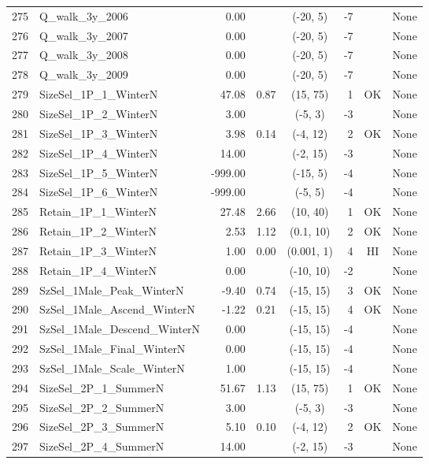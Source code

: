 \documentclass[12pt,]{article}
\begin{document}
\begin{landscape}
\begin{longtable}{rlrrcrcl}
  275 & Q\_walk\_3y\_2006 & 0.00 &  & (-20, 5) & -7 &  & None \\ 
  276 & Q\_walk\_3y\_2007 & 0.00 &  & (-20, 5) & -7 &  & None \\ 
  277 & Q\_walk\_3y\_2008 & 0.00 &  & (-20, 5) & -7 &  & None \\ 
  278 & Q\_walk\_3y\_2009 & 0.00 &  & (-20, 5) & -7 &  & None \\ 
  279 & SizeSel\_1P\_1\_WinterN & 47.08 & 0.87 & (15, 75) & 1 & OK & None \\ 
  280 & SizeSel\_1P\_2\_WinterN & 3.00 &  & (-5, 3) & -3 &  & None \\ 
  281 & SizeSel\_1P\_3\_WinterN & 3.98 & 0.14 & (-4, 12) & 2 & OK & None \\ 
  282 & SizeSel\_1P\_4\_WinterN & 14.00 &  & (-2, 15) & -3 &  & None \\ 
  283 & SizeSel\_1P\_5\_WinterN & -999.00 &  & (-15, 5) & -4 &  & None \\ 
  284 & SizeSel\_1P\_6\_WinterN & -999.00 &  & (-5, 5) & -4 &  & None \\ 
  285 & Retain\_1P\_1\_WinterN & 27.48 & 2.66 & (10, 40) & 1 & OK & None \\ 
  286 & Retain\_1P\_2\_WinterN & 2.53 & 1.12 & (0.1, 10) & 2 & OK & None \\ 
  287 & Retain\_1P\_3\_WinterN & 1.00 & 0.00 & (0.001, 1) & 4 & HI & None \\ 
  288 & Retain\_1P\_4\_WinterN & 0.00 &  & (-10, 10) & -2 &  & None \\ 
  289 & SzSel\_1Male\_Peak\_WinterN & -9.40 & 0.74 & (-15, 15) & 3 & OK & None \\ 
  290 & SzSel\_1Male\_Ascend\_WinterN & -1.22 & 0.21 & (-15, 15) & 4 & OK & None \\ 
  291 & SzSel\_1Male\_Descend\_WinterN & 0.00 &  & (-15, 15) & -4 &  & None \\ 
  292 & SzSel\_1Male\_Final\_WinterN & 0.00 &  & (-15, 15) & -4 &  & None \\ 
  293 & SzSel\_1Male\_Scale\_WinterN & 1.00 &  & (-15, 15) & -4 &  & None \\ 
  294 & SizeSel\_2P\_1\_SummerN & 51.67 & 1.13 & (15, 75) & 1 & OK & None \\ 
  295 & SizeSel\_2P\_2\_SummerN & 3.00 &  & (-5, 3) & -3 &  & None \\ 
  296 & SizeSel\_2P\_3\_SummerN & 5.10 & 0.10 & (-4, 12) & 2 & OK & None \\ 
  297 & SizeSel\_2P\_4\_SummerN & 14.00 &  & (-2, 15) & -3 &  & None \\ 

\end{longtable}
\end{landscape}
\end{document}
